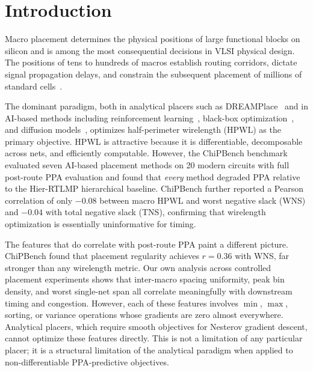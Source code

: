 \documentclass[sigconf,anonymous,review,9pt]{acmart}
\begin{document}


\maketitle


\section{Introduction}
\label{sec:intro}

Macro placement determines the physical positions of large functional
blocks on silicon and is among the most consequential decisions in VLSI
physical design. The positions of tens to hundreds of macros establish
routing corridors, dictate signal propagation delays, and constrain the
subsequent placement of millions of standard
cells~\cite{kahng2022vlsi, lin2019dreamplace}.

The dominant paradigm, both in analytical placers such as
DREAMPlace~\cite{lin2019dreamplace} and in AI-based methods including
reinforcement learning~\cite{mirhoseini2021graph, lai2022maskplace,
lai2023chipformer}, black-box optimization~\cite{shi2023wire}, and
diffusion models~\cite{lee2024chip}, optimizes half-perimeter wirelength
(HPWL) as the primary objective. HPWL is attractive because it is
differentiable, decomposable across nets, and efficiently computable.
However, the ChiPBench benchmark~\cite{chipbench2025} evaluated seven
AI-based placement methods on 20 modern circuits with full post-route
PPA evaluation and found that \emph{every} method degraded PPA relative
to the Hier-RTLMP hierarchical baseline. ChiPBench further reported a
Pearson correlation of only $-0.08$ between macro HPWL and worst
negative slack (WNS) and $-0.04$ with total negative slack (TNS),
confirming that wirelength optimization is essentially uninformative for
timing.

The features that do correlate with post-route PPA paint a different
picture. ChiPBench found that placement regularity achieves $r = 0.36$
with WNS, far stronger than any wirelength metric. Our own analysis
across controlled placement experiments shows that inter-macro spacing
uniformity, peak bin density, and worst single-net span all correlate
meaningfully with downstream timing and congestion. However, each of
these features involves $\min$, $\max$, sorting, or variance
operations whose gradients are zero almost everywhere. Analytical
placers, which require smooth objectives for Nesterov gradient descent,
cannot optimize these features directly. This is not a limitation of any
particular placer; it is a structural limitation of the analytical
paradigm when applied to non-differentiable PPA-predictive objectives.
\end{document}

